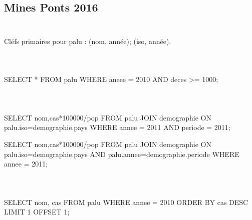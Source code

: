 \documentclass[10pt,fleqn]{article} %
\begin{document}

\vspace{2cm}
\pagestyle{fancy}
\thispagestyle{plain}


\def\columnseprulecolor{\color{ocre}}
\setlength{\columnseprule}{0.4pt} 

\begin{multicols}{2}
\subsection*{Mines Ponts 2016}

\subparagraph{}~\\
Cléfs primaires pour palu : (nom, année); (iso, année).

\subparagraph{}~\\
\begin{sql}
SELECT * FROM palu 
	WHERE aneee = 2010 AND deces >= 1000;
\end{sql}

\subparagraph{}~\\

\begin{sql}
SELECT nom,cas*100000/pop
	FROM palu
	JOIN demographie 
	ON palu.iso=demographie.pays
	WHERE annee = 2011 AND periode = 2011;

SELECT nom,cas*100000/pop
	FROM palu
	JOIN demographie 
	ON palu.iso=demographie.pays 
		AND palu.annee=demographie.periode
 	WHERE annee = 2011;
\end{sql}

\subparagraph{}~\\
\begin{sql}
SELECT nom, cas
	FROM palu
	WHERE annee = 2010 
	ORDER BY cas DESC
	LIMIT 1 OFFSET 1; 
\end{sql}


\end{multicols}
\end{document}
